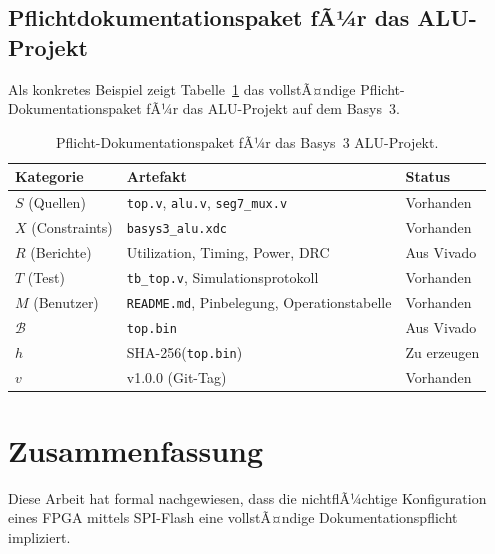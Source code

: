 ﻿\documentclass[a4paper,12pt]{article}
\theoremstyle{definition}
\begin{document}
\subsection{Pflichtdokumentationspaket fÃ¼r das ALU-Projekt}

Als konkretes Beispiel zeigt Tabelle~\ref{tab:alupaket} das vollstÃ¤ndige
Pflicht-Dokumentationspaket fÃ¼r das ALU-Projekt auf dem Basys~3.

\begin{table}[htbp]
    \centering
    \caption{Pflicht-Dokumentationspaket fÃ¼r das Basys~3 ALU-Projekt.}
    \label{tab:alupaket}
    \begin{tabular}{@{}lll@{}}
        \toprule
        Kategorie & Artefakt & Status \\
        \midrule
        $S$ (Quellen)      & \texttt{top.v}, \texttt{alu.v}, \texttt{seg7\_mux.v} & Vorhanden \\
        $X$ (Constraints)  & \texttt{basys3\_alu.xdc}                              & Vorhanden \\
        $R$ (Berichte)     & Utilization, Timing, Power, DRC                       & Aus Vivado \\
        $T$ (Test)         & \texttt{tb\_top.v}, Simulationsprotokoll              & Vorhanden \\
        $M$ (Benutzer)     & \texttt{README.md}, Pinbelegung, Operationstabelle    & Vorhanden \\
        $\mathcal{B}$      & \texttt{top.bin}                                      & Aus Vivado \\
        $h$                & SHA-256(\texttt{top.bin})                             & Zu erzeugen \\
        $v$                & v1.0.0 (Git-Tag)                                      & Vorhanden \\
        \bottomrule
    \end{tabular}
\end{table}

\section{Zusammenfassung}

Diese Arbeit hat formal nachgewiesen, dass die nichtflÃ¼chtige Konfiguration
eines FPGA mittels SPI-Flash eine vollstÃ¤ndige Dokumentationspflicht impliziert.
\end{document}
